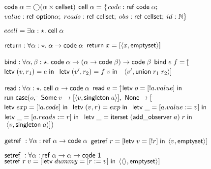 \begin{figure}
\mbox{}
\begin{specification}
\nextline $\mathsf{code}\;{\alpha} = \bigcirc{(\alpha \times \mathsf{cellset})}$ \nextline[1em]
$\mathsf{cell}\;{\alpha} = \{$\=$code: \mathsf{ref}\;\mathsf{code}\;{\alpha};$ \nextline
                   \>$value: \mathsf{ref}\;\mathsf{option }{\alpha};$ \nextline
                   \>$reads: \mathsf{ref}\;\mathsf{cellset};$ \nextline
                   \>$obs:   \mathsf{ref}\;\mathsf{cellset};$ \nextline
                   \>$id:    \mathbb{N}\}$ \nextline[1em]

$ecell = \exists \alpha:\star.\; \mathsf{cell}\;{\alpha}$ \nextline[1em]

$\mathsf{return} : \forall \alpha:\star.\; \alpha \to \mathsf{code}\;{\alpha}$ \nextline
$\mathsf{return}\;x = [\left<{x},{\mathsf{emptyset}}\right>]$ \nextline[1em]

$\mathsf{bind} : \forall \alpha,\beta:\star.\; \mathsf{code}\;{\alpha} \to (\alpha \to \mathsf{code}\;{\beta}) \to \mathsf{code}\;{\beta}$ \nextline
$\mathsf{bind}\;e\;f = [$\=$\mathsf{letv}\;(v,r_1) = e\;\mathsf{in}\;$ \nextline
                        \>$\mathsf{letv}\;(v',r_2) = f\;v\;\mathsf{in}\;$ \nextline
                        \>$\;\left<{v'},{\mathsf{union}\;r_1\;r_2}\right>]$\nextline[1em]

$\mathsf{read} : \forall \alpha:\star.\; \mathsf{cell}\;{\alpha} \to \mathsf{code}\;{\alpha}$ \nextline
$\mathsf{read}\;a = [$\=$\mathsf{letv}\;o = [!a.value]\;\mathsf{in}\;$ \nextline
                     \>$\mathsf{run}\;\mathsf{case}(o,$ \nextline
                     \>\qquad\= $\mathsf{Some}\;v \to [\left<{v},{\mathsf{singleton}\;a}\right>],$ \nextline
                     \>      \> $\mathsf{None} \to [$\=$\mathsf{letv}\;exp = [!a.code]\;\mathsf{in}\;$ \nextline
                     \>      \>                     \>$\mathsf{letv}\;(v,r) = exp\;\mathsf{in}\;$ \nextline
                     \>      \>                     \>$\mathsf{letv}\;\_ = [a.value := v]\;\mathsf{in}\;$\nextline
                     \>      \>                     \>$\mathsf{letv}\;\_ = [a.reads := r]\;\mathsf{in}\;$ \nextline
                     \>      \>                     \>$\mathsf{letv}\;\_ = \mathsf{iterset}\;(\mathsf{add\_observer}\;a)\;r\;\mathsf{in}\;$ \nextline
                     \>      \>                     \>$\;\left<{v},{\mathsf{singleton}\;a}\right>])$ \nextline[1em]

$\mathsf{getref}\; : \forall \alpha : \mathsf{ref}\;\alpha \to \mathsf{code}\;{\alpha}$ \nextline
$\mathsf{getref}\; r = [\mathsf{letv}\;v = [!r]\;\mathsf{in}\;\left<{v},{\mathsf{emptyset}}\right>]$ \nextline[1em]

$\mathsf{setref}\; : \forall \alpha : \mathsf{ref}\;\alpha \to \alpha \to \mathsf{code}\;{\mathbf{1}}$ \nextline
$\mathsf{setref}\; r\;v = [\mathsf{letv}\;dummy = [r := v]\;\mathsf{in}\;\left<{\left<\right>},{\mathsf{emptyset}}\right>]$ \nextline[1em]


\end{specification}
\end{figure}
